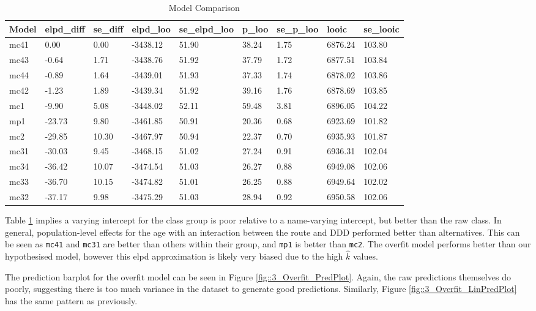\documentclass[11pt,twoside]{article}
\numberwithin{Theorem}{section}
\numberwithin{Definition}{section}
\numberwithin{Lemma}{section}
\numberwithin{Algorithm}{section}
\numberwithin{equation}{section}
\begin{document}
\begin{table}[ht]
	\centering
	\begin{tabular}{lllllllll}
		\hline
		Model & elpd\_diff & se\_diff & elpd\_loo & se\_elpd\_loo & p\_loo & se\_p\_loo & looic & se\_looic \\ 
		\hline \hline
		mc41 & 0.00 & 0.00 & -3438.12 & 51.90 & 38.24 & 1.75 & 6876.24 & 103.80 \\ 
		mc43 & -0.64 & 1.71 & -3438.76 & 51.92 & 37.79 & 1.72 & 6877.51 & 103.84 \\ 
		mc44 & -0.89 & 1.64 & -3439.01 & 51.93 & 37.33 & 1.74 & 6878.02 & 103.86 \\ 
		mc42 & -1.23 & 1.89 & -3439.34 & 51.92 & 39.16 & 1.76 & 6878.69 & 103.85 \\ 
		mc1 & -9.90 & 5.08 & -3448.02 & 52.11 & 59.48 & 3.81 & 6896.05 & 104.22 \\ 
		mp1 & -23.73 & 9.80 & -3461.85 & 50.91 & 20.36 & 0.68 & 6923.69 & 101.82 \\ 
		mc2 & -29.85 & 10.30 & -3467.97 & 50.94 & 22.37 & 0.70 & 6935.93 & 101.87 \\ 
		mc31 & -30.03 & 9.45 & -3468.15 & 51.02 & 27.24 & 0.91 & 6936.31 & 102.04 \\ 
		mc34 & -36.42 & 10.07 & -3474.54 & 51.03 & 26.27 & 0.88 & 6949.08 & 102.06 \\ 
		mc33 & -36.70 & 10.15 & -3474.82 & 51.01 & 26.25 & 0.88 & 6949.64 & 102.02 \\ 
		mc32 & -37.17 & 9.98 & -3475.29 & 51.03 & 28.94 & 0.92 & 6950.58 & 102.06 \\ 
		\hline
	\end{tabular}
	\caption{Model Comparison} 
	\label{table::4_Model_Comp}
\end{table}



Table \ref{table::4_Model_Comp} implies a varying intercept for the class group is poor relative to a name-varying intercept, but better than the raw class. In general, population-level effects for the age with an interaction between the route and DDD performed better than alternatives. This can be seen as \texttt{mc41} and \texttt{mc31} are better than others within their group, and \texttt{mp1} is better than \texttt{mc2}. The overfit model performs better than our hypothesised model, however this elpd approximation is likely very biased due to the high $\hat{k}$ values. 

The prediction barplot for the overfit model can be seen in Figure \ref{fig::3_Overfit_PredPlot}. Again, the raw predictions themselves do poorly, suggesting there is too much variance in the dataset to generate good predictions. Similarly, Figure \ref{fig::3_Overfit_LinPredPlot} has the same pattern as previously.  
\end{document}
